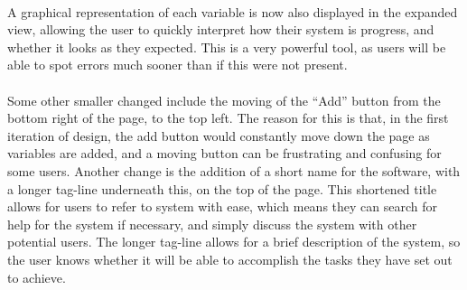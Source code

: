 \ \\
A graphical representation of each variable is now also displayed in the expanded view, allowing the user to quickly interpret how their system is progress, and whether it looks as they expected. This is a very powerful tool, as users will be able to spot errors much sooner than if this were not present.\ \\
\ \\
Some other smaller changed include the moving of the ``Add'' button from the bottom right of the page, to the top left. The reason for this is that, in the first iteration of design, the add button would constantly move down the page as variables are added, and a moving button can be frustrating and confusing for some users. Another change is the addition of a short name for the software, with a longer tag-line underneath this, on the top of the page. This shortened title allows for users to refer to system with ease, which means they can search for help for the system if necessary, and simply discuss the system with other potential users. The longer tag-line allows for a brief description of the system, so the user knows whether it will be able to accomplish the tasks they have set out to achieve.


